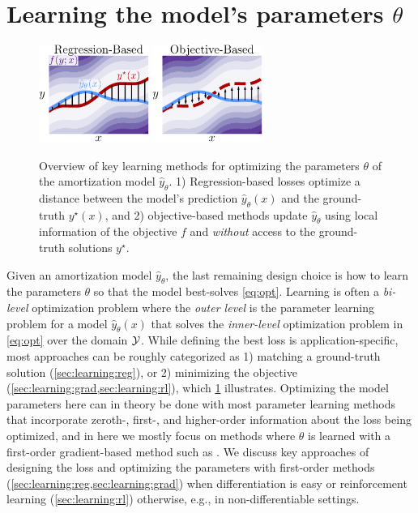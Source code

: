 \documentclass[twoside,11pt]{article}
\newcommand{\eg}{e.g.\xspace}
\begin{document}
\section{Learning the model's parameters $\theta$}
\label{sec:learning}

\begin{figure}[t]
  \centering
  \includegraphics[width=0.32\textwidth]{fig/learning-reg.pdf}
  \hspace{10mm}
  \includegraphics[width=0.32\textwidth]{fig/learning-obj.pdf}
  \caption{Overview of key learning methods for optimizing
    the parameters $\theta$ of the amortization model $\hat y_\theta$.
    1) Regression-based losses optimize a distance between
    the model's prediction $\hat y_\theta(x)$ and the
    ground-truth $y^\star(x)$, and 2) objective-based
    methods update $\hat y_\theta$ using
    local information of the objective $f$
    and \emph{without} access to the ground-truth
    solutions $y^\star$.
  }
  \label{fig:learning}
\end{figure}

Given an amortization model $\hat y_\theta$, the last remaining design choice
is how to learn the parameters $\theta$
so that the model best-solves \cref{eq:opt}.
Learning is often a \emph{bi-level} optimization problem
where the \emph{outer level} is the parameter
learning problem for a model $\hat y_\theta(x)$ that solves
the \emph{inner-level} optimization problem in \cref{eq:opt}
over the domain ${\mathcal{Y}}$.
While defining the best loss is application-specific,
most approaches can be roughly categorized as
1) matching a ground-truth solution (\cref{sec:learning:reg}),
or 2) minimizing the objective (\cref{sec:learning:grad,sec:learning:rl}),
which \cref{fig:learning} illustrates.
Optimizing the model parameters here can in theory be done
with most parameter learning methods that incorporate
zeroth-, first-, and higher-order information
about the loss being optimized, and in here we mostly focus
on methods where $\theta$ is learned with a
first-order gradient-based method
such as \citet{nesterov1983method,duchi2011adaptive,zeiler2012adadelta,kingma2014adam}.
We discuss key approaches of designing the loss
and optimizing the parameters with first-order methods
(\cref{sec:learning:reg,sec:learning:grad})
when differentiation is easy
or reinforcement learning (\cref{sec:learning:rl})
otherwise, \eg, in non-differentiable settings.
\end{document}
